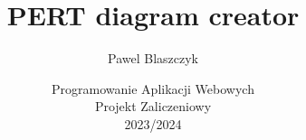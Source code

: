 \documentclass[]{article}
\title{PERT diagram creator}
\author{Pawel Blaszczyk}
\date{Programowanie Aplikacji Webowych\\[0.5em]
	Projekt Zaliczeniowy\\[1em]
	2023/2024}
\begin{document}
\maketitle

\begin{abstract}

\end{abstract}

\newpage



\end{document}
